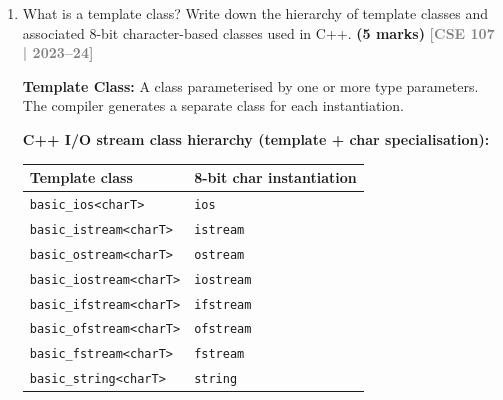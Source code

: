 \documentclass[12pt,a3paper]{article}
\newcommand{\yr}[1]{\hfill\textcolor{gray}{\small\textbf{[#1]}}}
\newcommand{\mk}[1]{\textcolor{orange!70!black}{\small\textbf{(#1 marks)}}}
\begin{document}
\begin{enumerate}
\begin{tcolorbox}
\begin{lstlisting}[language=C++]
    // (b) Count even numbers
    cout << "Even count: "
         << count_if(lst.begin(), lst.end(),
                     [](int x){ return x % 2 == 0; }) << "\n"; // 7

    // (c) Remove 12s into a new container
    list<int> notwelve;
    copy_if(lst.begin(), lst.end(),
            back_inserter(notwelve),
            [](int x){ return x != 12; });
    for(int x : notwelve) cout << x << " "; cout << "\n";

    // (d) Reverse the original list
    lst.reverse();
    for(int x : lst) cout << x << " "; cout << "\n";

    // (e) Replace each element with its square using transform
    transform(lst.begin(), lst.end(), lst.begin(),
              [](int x){ return x * x; });
    for(int x : lst) cout << x << " "; cout << "\n";

    return 0;
}
\end{lstlisting}

\end{tcolorbox}


\item What is a template class? Write down the hierarchy of template classes and associated 8-bit character-based classes used in C++. \mk{5}
\yr{CSE 107 | 2023--24}
\begin{tcolorbox}[enhanced,breakable,ansbox,colback=cH!4,colframe=cH,
  boxrule=0.8pt,arc=5pt,
  title={\textbf{Answer --- Template class hierarchy and 8-bit character-based classes}},
  fonttitle=\bfseries\color{white},colbacktitle=cH]

\textbf{Template Class:} A class parameterised by one or more type
parameters.  The compiler generates a separate class for each
instantiation.

\textbf{C++ I/O stream class hierarchy (template + char specialisation):}

\begin{center}
\small
\begin{tabular}{@{}ll@{}}
\toprule
\textbf{Template class} & \textbf{8-bit char instantiation} \\
\midrule
\texttt{basic\_ios<charT>}       & \texttt{ios} \\
\texttt{basic\_istream<charT>}   & \texttt{istream} \\
\texttt{basic\_ostream<charT>}   & \texttt{ostream} \\
\texttt{basic\_iostream<charT>}  & \texttt{iostream} \\
\texttt{basic\_ifstream<charT>}  & \texttt{ifstream} \\
\texttt{basic\_ofstream<charT>}  & \texttt{ofstream} \\
\texttt{basic\_fstream<charT>}   & \texttt{fstream} \\
\texttt{basic\_string<charT>}    & \texttt{string} \\
\bottomrule
\end{tabular}
\end{center}


\end{tcolorbox}
\end{enumerate}
\end{document}
